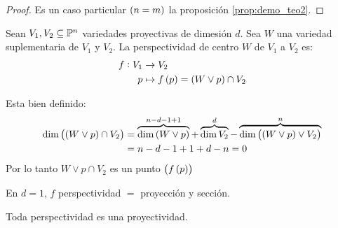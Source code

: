 \begin{proof}
	Es un caso particular $\left( n = m \right)$ la proposición \ref{prop:demo_teo2}.
\end{proof}
\begin{defi}
	Sean $V_1, V_2 \subseteq \mathbb{P}^n$ variedades proyectivas de dimesión $d$. Sea $W$ una variedad suplementaria de $V_1$ y $V_2$. La perspectividad de centro $W$ de $V_1$ a $V_2$ es:
	\begin{align*}
		f : V_1 &\to V_2 \\
		p &\mapsto f \left( p \right) = \left( W \vee p \right) \cap V_2
	\end{align*}
\end{defi}
\begin{obs}
	Esta bien definido:
	\begin{align*}
		\dim \left( \left( W \vee p \right) \cap V_2 \right) &= \overbrace{\dim \left( W \vee p \right)}^{ n -d -1 + 1} + \overbrace{\dim V_2}^{d} - \overbrace{\dim \left( \left( W \vee p \right) \vee V_2 \right)}^n \\
		&= n -d -1 + 1 + d - n = 0
	\end{align*}
	Por lo tanto $W \vee p \cap V_2$ es un punto $\left( f \left( p \right) \right)$
\end{obs}
\begin{obs}
	En $d = 1$, $f$ perspectividad $=$ proyección y sección.
\end{obs}
\begin{col}
	Toda perspectividad es una proyectividad.
\end{col}
